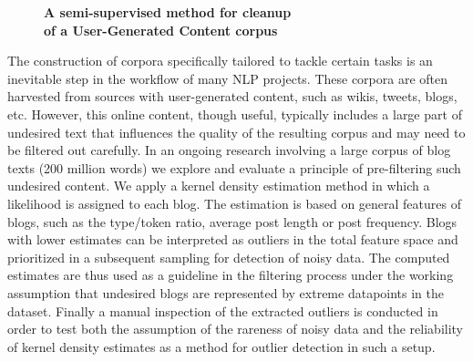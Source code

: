 \documentclass[10pt, a4paper, twopage, headinclude, footinclude, BCOR5mm]{scrartcl}
\begin{document}
\newpage

\begin{figure}[t!]
\centering
\large\textbf{A semi-supervised method for cleanup \\ of a User-Generated Content corpus}
\vspace*{0.5cm}
\end{figure}


        \begin{table}[t!]
    \end{table}
        \begin{table}[t!]
    \end{table}

\noindent
The construction of corpora specifically tailored to tackle certain tasks is an inevitable step in the workflow of many NLP projects. These corpora are often harvested from sources with user-generated content, such as wikis, tweets, blogs, etc. However, this online content, though useful, typically includes a large part of undesired text that influences the quality of the resulting corpus and may need to be filtered out carefully.  In an ongoing research involving a large corpus of blog texts (200 million words) we explore and evaluate a principle of pre-filtering such undesired content. We apply a kernel density estimation method in which a likelihood is assigned to each blog. The estimation is based on general features of blogs, such as the type/token ratio, average post length or post frequency. Blogs with lower estimates can be interpreted as outliers in the total feature space and prioritized in a subsequent sampling for detection of noisy data. The computed estimates are thus used as a guideline in the filtering process under the working assumption that undesired blogs are represented by extreme datapoints in the dataset. Finally a manual inspection of the extracted outliers is conducted in order to test both the assumption of the rareness of noisy data and the reliability of kernel density estimates as a method for outlier detection in such a setup.
\end{document}
